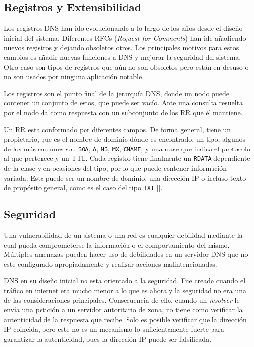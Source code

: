 \subsection{Registros y Extensibilidad}

Los registros DNS han ido evolucionando a lo largo de los años desde el diseño inicial del sistema. Diferentes RFCs (\textit{Request for Comments}) han ido añadiendo nuevos registros y dejando obsoletos otros. Los principales motivos para estos cambios es añadir nuevas funciones a DNS y mejorar la seguridad del sistema. Otro caso son tipos de registros que aún no son obsoletos pero están en desuso o no son usados por ninguna aplicación notable.

Los registros son el punto final de la jerarquía DNS, donde un nodo puede contener un conjunto de estos, que puede ser vacío. Ante una consulta resuelta por el nodo da como respuesta con un subconjunto de los RR que él mantiene.

Un RR esta conformado por diferentes campos. De forma general, tiene un propietario, que es el nombre de dominio dónde es encontrado, un tipo, algunos de los más comunes son \verb|SOA|, \verb|A|, \verb|NS|, \verb|MX|, \verb|CNAME|, y una clase que indica el protocolo al que pertenece y un TTL. Cada registro tiene finalmente un \verb|RDATA| dependiente de la clase y en ocasiones del tipo, por lo que puede contener información variada. Este puede ser un nombre de dominio, una dirección IP o incluso texto de propósito general, como es el caso del tipo \verb|TXT| [\cite{rfc_1464}].

\subsection{Seguridad}

Una vulnerabilidad de un sistema o una red es cualquier debilidad mediante la cual pueda comprometerse la información o el comportamiento del mismo. Múltiples amenazas pueden hacer uso de debilidades en un servidor DNS que no este configurado apropiadamente y realizar acciones malintencionadas.

DNS en su diseño inicial no esta orientado a la seguridad. Fue creado cuando el tráfico en internet era mucho menor a lo que es ahora y la seguridad no era una de las consideraciones principales. Consecuencia de ello, cuando un \textit{resolver} le envía una petición a un servidor autoritario de zona, no tiene como verificar la autenticidad de la respuesta que recibe. Solo es posible verificar que la dirección IP coincida, pero este no es un mecanismo lo suficientemente fuerte para garantizar la autenticidad, pues la dirección IP puede ser falsificada.

